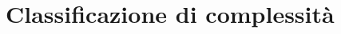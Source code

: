 \documentclass[../template]{subfiles}
\begin{document}
\section{Classificazione di complessità}
\end{document}
